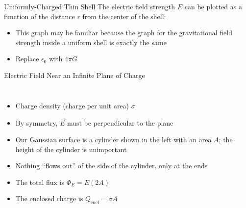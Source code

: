 \documentclass[12pt,aspectratio=169]{beamer}
\begin{document}
\begin{frame}{Uniformly-Charged Thin Shell}
  The electric field strength $E$ can be plotted as a function of the distance
  $r$ from the center of the shell:
  \begin{center}
  \end{center}
  \begin{itemize}
  \item This graph may be familiar because the graph for the gravitational field
    strength inside a uniform shell is exactly the same
  \item Replace $\epsilon_0$ with $4\pi G$
  \end{itemize}
\end{frame}






\begin{frame}{Electric Field Near an Infinite Plane of Charge}
  \begin{columns}

    \begin{itemize}
    \item Charge density (charge per unit area) $\sigma$
    \item By symmetry, $\vec E$ must be perpendicular to the plane
    \item Our Gaussian surface is a cylinder shown in the left with an area
      $A$; the height of the cylinder is unimportant
    \item Nothing ``flows out'' of the side of the cylinder, only at the ends
    \item The total flux is $\Phi_E=E(2A)$
    \item The enclosed charge is $Q_\text{encl}=\sigma A$
    \end{itemize}
  \end{columns}
\end{frame}
\end{document}
